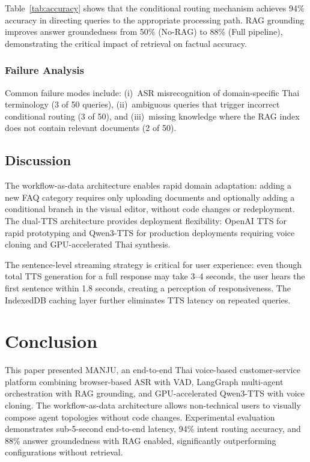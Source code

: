 \documentclass[10pt, a4paper, twocolumn]{article}
\begin{document}
\noindent Table~\ref{tab:accuracy} shows that the conditional routing mechanism achieves 94\% accuracy in directing queries to the appropriate processing path.
RAG grounding improves answer groundedness from 50\% (No-RAG) to 88\% (Full pipeline), demonstrating the critical impact of retrieval on factual accuracy.

\subsubsection{Failure Analysis}
Common failure modes include: (i)~ASR misrecognition of domain-specific Thai terminology (3 of 50 queries), (ii)~ambiguous queries that trigger incorrect conditional routing (3 of 50), and (iii)~missing knowledge where the RAG index does not contain relevant documents (2 of 50).

\subsection{Discussion}

The workflow-as-data architecture enables rapid domain adaptation: adding a new FAQ category requires only uploading documents and optionally adding a conditional branch in the visual editor, without code changes or redeployment.
The dual-TTS architecture provides deployment flexibility: OpenAI TTS for rapid prototyping and Qwen3-TTS for production deployments requiring voice cloning and GPU-accelerated Thai synthesis.

The sentence-level streaming strategy is critical for user experience: even though total TTS generation for a full response may take 3--4 seconds, the user hears the first sentence within 1.8 seconds, creating a perception of responsiveness.
The IndexedDB caching layer further eliminates TTS latency on repeated queries.

\section{Conclusion}
\label{sec:conclusion}

This paper presented MANJU, an end-to-end Thai voice-based customer-service platform combining browser-based ASR with VAD, LangGraph multi-agent orchestration with RAG grounding, and GPU-accelerated Qwen3-TTS with voice cloning.
The workflow-as-data architecture allows non-technical users to visually compose agent topologies without code changes.
Experimental evaluation demonstrates sub-5-second end-to-end latency, 94\% intent routing accuracy, and 88\% answer groundedness with RAG enabled, significantly outperforming configurations without retrieval.
\end{document}
